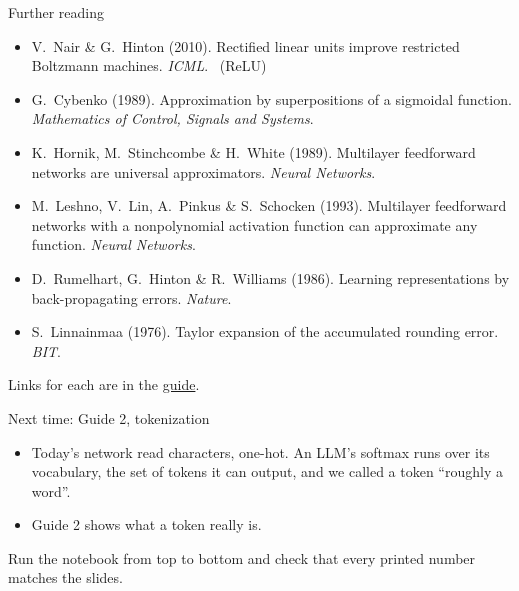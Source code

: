 \documentclass[aspectratio=169,11pt,t,\primeropts]{beamer}
\begin{document}
\begin{frame}{Further reading}
  \small
  \begin{itemize}
    \item V.\ Nair \& G.\ Hinton (2010). Rectified linear units improve restricted Boltzmann
      machines. \emph{ICML}. \ (ReLU)
    \item G.\ Cybenko (1989). Approximation by superpositions of a sigmoidal function.
      \emph{Mathematics of Control, Signals and Systems}.
    \item K.\ Hornik, M.\ Stinchcombe \& H.\ White (1989). Multilayer feedforward networks are
      universal approximators. \emph{Neural Networks}.
    \item M.\ Leshno, V.\ Lin, A.\ Pinkus \& S.\ Schocken (1993). Multilayer feedforward networks
      with a nonpolynomial activation function can approximate any function. \emph{Neural
      Networks}.
    \item D.\ Rumelhart, G.\ Hinton \& R.\ Williams (1986). Learning representations by
      back-propagating errors. \emph{Nature}.
    \item S.\ Linnainmaa (1976). Taylor expansion of the accumulated rounding error. \emph{BIT}.
  \end{itemize}
  {\small\color{primerMuted}Links for each are in the \href{\guideurl}{guide}.}
\end{frame}

\begin{frame}{Next time: Guide 2, tokenization}
  \begin{itemize}
    \item Today's network read characters, one-hot. An LLM's softmax runs over its vocabulary,
      the set of tokens it can output, and we called a token ``roughly a word''.
    \item Guide 2 shows what a token really is.
  \end{itemize}
  \vspace{4mm}
  \begin{keyidea}
    Run the notebook from top to bottom and check that every printed number matches the slides.
  \end{keyidea}
\end{frame}
\end{document}
